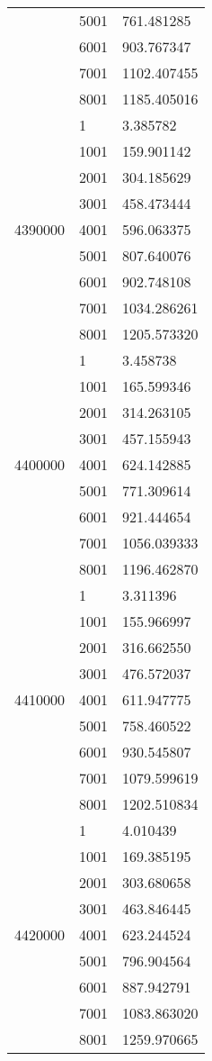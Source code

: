 \begin{table}[htb!]
\begin{tabular}{lll}
 & 5001 & 761.481285 \\
 & 6001 & 903.767347 \\
 & 7001 & 1102.407455 \\
 & 8001 & 1185.405016 \\
\multirow[c]{9}{*}{4390000} & 1 & 3.385782 \\
 & 1001 & 159.901142 \\
 & 2001 & 304.185629 \\
 & 3001 & 458.473444 \\
 & 4001 & 596.063375 \\
 & 5001 & 807.640076 \\
 & 6001 & 902.748108 \\
 & 7001 & 1034.286261 \\
 & 8001 & 1205.573320 \\
\multirow[c]{9}{*}{4400000} & 1 & 3.458738 \\
 & 1001 & 165.599346 \\
 & 2001 & 314.263105 \\
 & 3001 & 457.155943 \\
 & 4001 & 624.142885 \\
 & 5001 & 771.309614 \\
 & 6001 & 921.444654 \\
 & 7001 & 1056.039333 \\
 & 8001 & 1196.462870 \\
\multirow[c]{9}{*}{4410000} & 1 & 3.311396 \\
 & 1001 & 155.966997 \\
 & 2001 & 316.662550 \\
 & 3001 & 476.572037 \\
 & 4001 & 611.947775 \\
 & 5001 & 758.460522 \\
 & 6001 & 930.545807 \\
 & 7001 & 1079.599619 \\
 & 8001 & 1202.510834 \\
\multirow[c]{9}{*}{4420000} & 1 & 4.010439 \\
 & 1001 & 169.385195 \\
 & 2001 & 303.680658 \\
 & 3001 & 463.846445 \\
 & 4001 & 623.244524 \\
 & 5001 & 796.904564 \\
 & 6001 & 887.942791 \\
 & 7001 & 1083.863020 \\
 & 8001 & 1259.970665 \\

\end{tabular}
\end{table}
